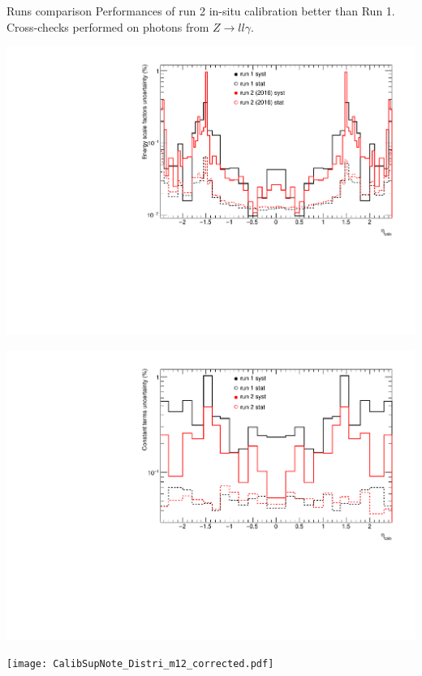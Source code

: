 \begin{frame}{Runs comparison}
  Performances of run 2 in-situ calibration better than Run 1.
  Cross-checks performed on photons from $Z\rightarrow ll\gamma$.
  \begin{minipage}{0.42\linewidth} 
    \includegraphics[width=\linewidth]{Figures/CompareSystRun_alpha.pdf}
  \end{minipage}
  \hfill
  \begin{minipage}{0.42\linewidth}
    \includegraphics[width=\linewidth]{Figures/CompareSystRun_c.pdf}
  \end{minipage}
  \centering
  \begin{minipage}{0.47\linewidth}
    \texttt{[image: CalibSupNote\_Distri\_m12\_corrected.pdf]}
  \end{minipage}

\end{frame}

